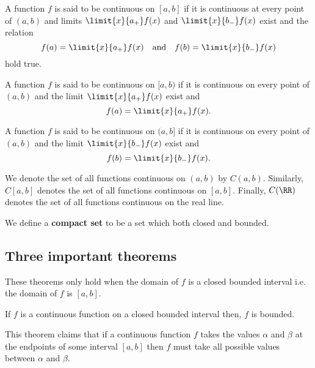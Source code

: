 \documentclass[12pt, a4paper]{article}
\begin{document}
\begin{definition}
    A function \(f\) is said to be continuous on \([a,b]\) if it is continuous at every point of \((a,b)\) and limits \(\limit{x}{a_+}f(x)\) and \(\limit{x}{b_-}f(x)\) exist and the relation 
    \[f(a)=\limit{x}{a_+}f(x) \quad \text{and} \quad f(b)=\limit{x}{b_-}f(x)\] hold true.
\end{definition}

\begin{definition}
    A function \(f\) is said to be continuous on \([a,b)\) if it is continuous on every point of \((a,b)\) and the limit \(\limit{x}{a_+}f(x)\) exist and \[f(a)=\limit{x}{a_+}f(x).\]
\end{definition}

\begin{definition}
    A function \(f\) is said to be continuous on \((a,b]\) if it is continuous on every point of \((a,b)\) and the limit \(\limit{x}{b_-}f(x)\) exist and \[f(b)=\limit{x}{b_-}f(x).\]
\end{definition}

\begin{definition}
    We denote the set of all functions continuous on \((a,b)\) by \(C(a,b)\). Similarly, \(C[a,b]\) denotes the set of all functions continuous on \([a,b]\). Finally, \(C(\RR)\) denotes the set of all functions continuous on the real line.
\end{definition}

\begin{definition}
    We define a \textbf{compact set} to be a set which both closed and bounded.
\end{definition}

\subsection{Three important theorems}

\begin{mdremark}
    These theorems only hold when the domain of \(f\) is a closed bounded interval i.e. the domain of \(f\) is \([a,b]\).
\end{mdremark}

\begin{mdthm}
    If \(f\) is a continuous function on a closed bounded interval then, \(f\) is bounded.
\end{mdthm}

\begin{mdnote}
    This theorem claims that if a continuous function \(f\) takes the values \(\alpha\) and \(\beta\) at the endpoints of some interval \([a,b]\) then \(f\) must take all possible values between \(\alpha\) and \(\beta\).
\end{mdnote}
\end{document}
